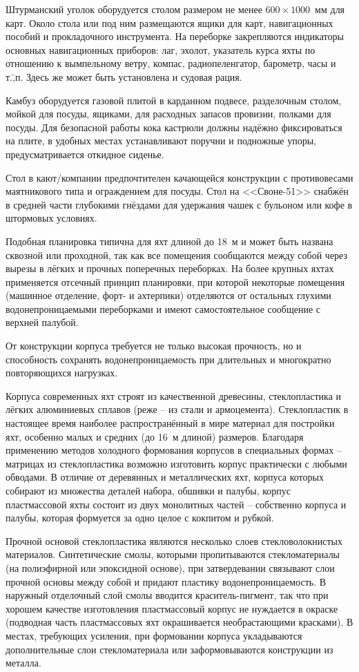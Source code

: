 Штурманский уголок оборудуется столом размером не менее
$600 \times 1000$~мм для карт. Около стола или под ним размещаются
ящики для карт, навигационных пособий и прокладочного инструмента. На
переборке закрепляются индикаторы основных навигационных приборов:
лаг, эхолот, указатель курса яхты по отношению к вымпельному ветру,
компас, радиопеленгатор, барометр, часы и т.\=,п. Здесь же может быть
установлена и судовая рация.

Камбуз оборудуется газовой плитой в карданном подвесе, разделочным
столом, мойкой для посуды, ящиками, для расходных запасов провизии,
полками для посуды. Для безопасной работы кока кастрюли должны надёжно
фиксироваться на плите, в удобных местах устанавливают поручни и
подножные упоры, предусматривается откидное сиденье.

Стол в кают\-/компании предпочтителен качающейся конструкции с
противовесами маятникового типа и ограждением для посуды. Стол на
<<Своне-51>> снабжён в средней части глубокими гнёздами для удержания
чашек с бульоном или кофе в штормовых условиях.

Подобная планировка типична для яхт длиной до 18~м и может быть
названа сквозной или проходной, так как все помещения сообщаются между
собой через вырезы в лёгких и прочных поперечных переборках. На более
крупных яхтах применяется отсечный принцип планировки, при которой
некоторые помещения (машинное отделение, форт- и ахтерпики) отделяются
от остальных глухими водонепроницаемыми переборками и имеют
самостоятельное сообщение с верхней палубой.

От конструкции корпуса требуется не только высокая прочность, но и
способность сохранять водонепроницаемость при длительных и многократно
повторяющихся нагрузках.

Корпуса современных яхт строят из качественной древесины,
стеклопластика и лёгких алюминиевых сплавов (реже \--- из стали и
армоцемента). Стеклопластик в настоящее время наиболее
распространённый в мире материал для постройки яхт, особенно малых и
средних (до 16~м длиной) размеров. Благодаря применению методов
холодного формования корпусов в специальных формах \--- матрицах из
стеклопластика возможно изготовить корпус практически с любыми
обводами. В отличие от деревянных и металлических яхт, корпуса которых
собирают из множества деталей набора, обшивки и палубы, корпус
пластмассовой яхты состоит из двух монолитных частей \--- собственно
корпуса и палубы, которая формуется за одно целое с кокпитом и рубкой.

Прочной основой стеклопластика являются несколько слоев
стекловолокнистых материалов. Синтетические смолы, которыми
пропитываются стекломатериалы (на полиэфирной или эпоксидной основе),
при затвердевании связывают слои прочной основы между собой и придают
пластику водонепроницаемость. В наружный отделочный слой смолы
вводится краситель-пигмент, так что при хорошем качестве изготовления
пластмассовый корпус не нуждается в окраске (подводная часть
пластмассовых яхт окрашивается необрастающими красками). В местах,
требующих усиления, при формовании корпуса укладываются дополнительные
слои стекломатериала или заформовываются конструкции из металла.

